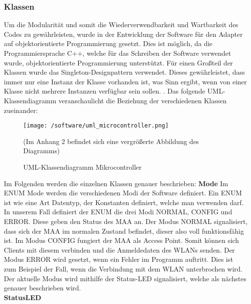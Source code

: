 \documentclass[11pt, twoside]{article}
\begin{document}
\subsubsection{Klassen}
Um die Modularität und somit die Wiederverwendbarkeit und Wartbarkeit des Codes zu gewährleisten, wurde in der Entwicklung der Software für den Adapter auf objektorientierte Programmierung gesetzt. Dies ist möglich, da die Programmiersprache C++, welche für das Schreiben der Software verwendet wurde, objektorientierte Programmierung unterstützt. Für einen Großteil der Klassen wurde das Singleton-Designpattern verwendet. Dieses gewährleistet, dass immer nur eine Instanz der Klasse vorhanden ist, was Sinn ergibt, wenn von einer Klasse nicht mehrere Instanzen verfügbar sein sollen. \parencite[vgl.][]{noauthor_urlpi14_nodate}. \newline
Das folgende UML-Klassendiagramm veranschaulicht die Beziehung der verschiedenen Klassen zueinander:
\begin{figure}[H]
	\texttt{[image: /software/uml\_microcontroller.png]}
	\caption{UML-Klassendiagramm Mikrocontroller}
	        \small{(Im \glqq Anhang 2\grqq{} befindet sich eine vergrößerte Abbildung des Diagramms)}
\end{figure}
\noindent
Im Folgenden werden die einzelnen Klassen genauer beschrieben:
\vspace{4mm}\newline
\textbf{Mode} \newline
Im ENUM \glqq Mode\grqq{} werden die verschiedenen Modi der Software definiert. Ein ENUM ist wie eine Art Datentyp, der Konstanten definiert, welche man verwenden darf. \parencite[vgl.][]{noauthor_urlpi15_nodate} \newline
In unserem Fall definiert der ENUM die drei Modi \glqq NORMAL\grqq{}, \glqq CONFIG\grqq{} und \glqq ERROR\grqq{}. Diese geben den Status des MAA an. Der Modus \glqq NORMAL\grqq{} signalisiert, dass sich der MAA im normalen Zustand befindet, dieser also voll funktionsfähig ist. Im Modus \glqq CONFIG\grqq{} fungiert der MAA als Access Point. Somit können sich Clients mit diesem verbinden und die Anmeldedaten des WLANs senden. Der Modus \glqq ERROR\grqq{} wird gesetzt, wenn ein Fehler im Programm auftritt. Dies ist zum Beispiel der Fall, wenn die Verbindung mit dem WLAN unterbrochen wird. Der aktuelle Modus wird mithilfe der Status-LED signalisiert, welche als nächstes genauer beschrieben wird. \newline \\
\textbf{StatusLED} \\
\end{document}
